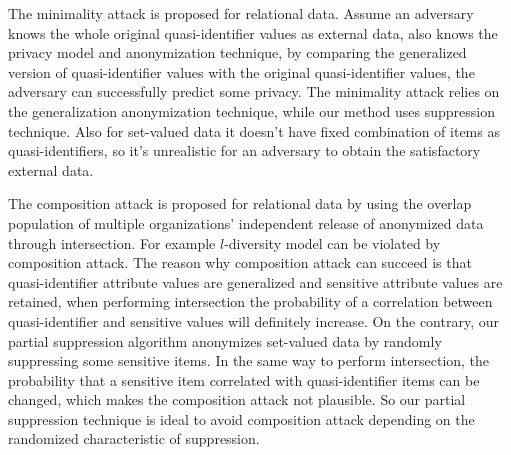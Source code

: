 The minimality attack \cite{Wong:2007:Minimality}
is proposed for relational data. Assume an adversary knows the whole original
quasi-identifier values as external data, also knows the privacy model and
anonymization technique, by comparing the generalized version of
quasi-identifier values with the original quasi-identifier values, the
adversary can successfully predict some privacy. The minimality attack relies
on the generalization anonymization technique, while our method uses
suppression technique. Also for set-valued data it doesn't have fixed
combination of items as quasi-identifiers, so it's unrealistic for an
adversary to obtain the satisfactory external data.

The composition attack \cite{Ganta:2008:Composition} is proposed for relational data by using the overlap population of multiple organizations' independent release of anonymized data through intersection. For example $l$-diversity \cite{Ganta:2008:Composition} model can be violated by composition attack. 
The reason why composition attack can succeed is that quasi-identifier attribute values are generalized and sensitive attribute values are retained, when performing intersection the probability of a correlation between quasi-identifier and sensitive values will definitely increase. On the contrary, our partial suppression algorithm anonymizes set-valued data by randomly suppressing some sensitive items. 
In the same way to perform intersection, the probability that a sensitive item correlated with quasi-identifier items can be changed, which makes the composition attack not plausible. So our partial suppression technique is ideal to avoid composition attack depending on the randomized characteristic of suppression.

